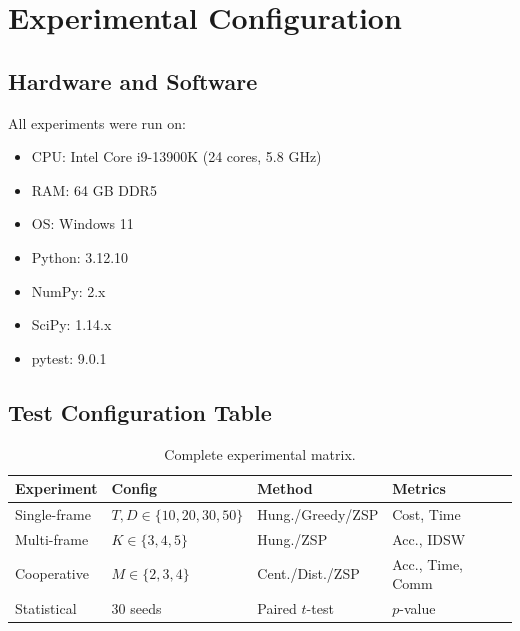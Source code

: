 \section{Experimental Configuration}
\label{app:config}

\subsection{Hardware and Software}

All experiments were run on:
\begin{itemize}[leftmargin=*]
    \item CPU: Intel Core i9-13900K (24 cores, 5.8 GHz)
    \item RAM: 64 GB DDR5
    \item OS: Windows 11
    \item Python: 3.12.10
    \item NumPy: 2.x
    \item SciPy: 1.14.x
    \item pytest: 9.0.1
\end{itemize}

\subsection{Test Configuration Table}

\begin{table}[H]
    \centering
    \caption{Complete experimental matrix.}
    \label{tab:config}
    \begin{tabular}{l l l l}
        \toprule
        Experiment & Config & Method & Metrics \\
        \midrule
        Single-frame & $T,D \in \{10,20,30,50\}$ & Hung./Greedy/ZSP & Cost, Time \\
        Multi-frame & $K \in \{3,4,5\}$ & Hung./ZSP & Acc., IDSW \\
        Cooperative & $M \in \{2,3,4\}$ & Cent./Dist./ZSP & Acc., Time, Comm \\
        Statistical & 30 seeds & Paired $t$-test & $p$-value \\
        \bottomrule
    \end{tabular}
\end{table}